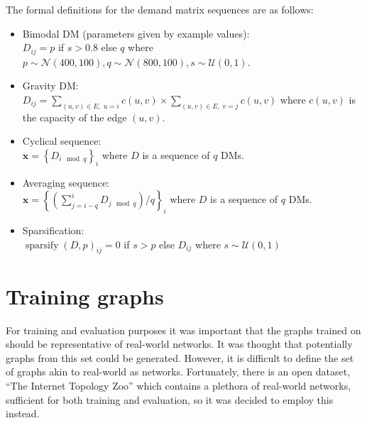 The formal definitions for the demand matrix sequences are as follows:
\begin{itemize}
  \item Bimodal DM (parameters given by example values):\\
    $D_{ij} = p$ if $s > 0.8$ else $q$ where $p \sim \mathcal{N}(400, 100), q \sim \mathcal{N}(800, 100), s \sim \mathcal{U}(0,1)$.
  \item Gravity DM:\\
    $D_{ij} = \sum_{(u, v) \in E,\; u = i }{c(u,v)} \times \sum_{(u, v) \in E,\; v = j }{c(u, v)}$ where $c(u,v)$ is the capacity of the edge $(u,v)$.
  \item Cyclical sequence:\\
    $\bm{x} = \left\{ D_{i \mod q} \right\}_{i}$ where $D$ is a sequence of $q$ DMs.
  \item Averaging sequence:\\
    $\bm{x} = \left\{\left(\sum_{j=i-q}^{i}{D_{j \mod q}}\right) / q \right\}_{i}$ where $D$ is a sequence of $q$ DMs.
  \item Sparsification:\\
    $\operatorname{sparsify}(D, p)_{ij} = 0$ if $s > p$ else $D_{ij}$ where $s \sim \mathcal{U}(0,1)$
\end{itemize}

\section{Training graphs}
For training and evaluation purposes it was important that the graphs trained on should be representative of real-world networks. It was thought that potentially graphs from this set could be generated. However, it is difficult to define the set of graphs akin to real-world \ac{as} networks. Fortunately, there is an open dataset, ``The Internet Topology Zoo''\cite{6027859} which contains a plethora of real-world networks, sufficient for both training and evaluation, so it was decided to employ this instead.

